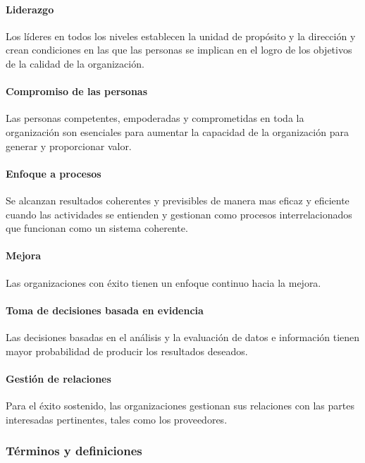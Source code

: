 					\paragraph{Liderazgo}
						Los líderes en todos los niveles establecen la unidad de propósito y la dirección y crean condiciones en
						las que las personas se implican en el logro de los objetivos de la calidad de la organización.
					\paragraph{Compromiso de las personas}
						Las personas competentes, empoderadas y comprometidas en toda la organización son esenciales para
						aumentar la capacidad de la organización para generar y proporcionar valor.
					\paragraph{Enfoque a procesos}
						Se alcanzan resultados coherentes y previsibles de manera mas eficaz y eficiente cuando las actividades
						se entienden y gestionan como procesos interrelacionados que funcionan como un sistema coherente.
					\paragraph{Mejora}
						Las organizaciones con éxito tienen un enfoque continuo hacia la mejora.
						
					\newpage
					\thispagestyle{plain}
					
					\paragraph{Toma de decisiones basada en evidencia}
						Las decisiones basadas en el análisis y la evaluación de datos e información tienen mayor probabilidad
						de producir los resultados deseados.
					
					\paragraph{Gestión de relaciones}
						Para el éxito sostenido, las organizaciones gestionan sus relaciones con las partes interesadas
						pertinentes, tales como los proveedores.
				
				\subsubsection{Términos y definiciones}
